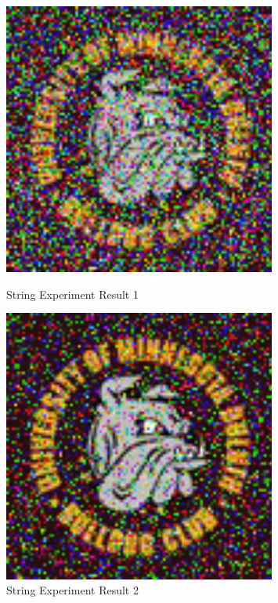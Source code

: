 \documentclass{article}
\begin{document}
\begin{figure}[ht]
    \centering
    \begin{minipage}{0.45\textwidth}
        \centering
        \includegraphics[width=0.8\textwidth]{bulldog000006} %
        \caption{String Experiment Result 1}
    \end{minipage}\hfill
    \begin{minipage}{0.45\textwidth}
        \centering
        \includegraphics[width=0.8\textwidth]{bulldog000010} %
        \caption{String Experiment Result 2}
    \end{minipage}
\end{figure}
\end{document}
